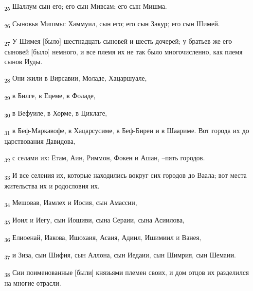 \begin{tcolorbox}
\textsubscript{25} Шаллум сын его; его сын Мивсам; его сын Мишма.
\end{tcolorbox}
\begin{tcolorbox}
\textsubscript{26} Сыновья Мишмы: Хаммуил, сын его; его сын Закур; его сын Шимей.
\end{tcolorbox}
\begin{tcolorbox}
\textsubscript{27} У Шимея [было] шестнадцать сыновей и шесть дочерей; у братьев же его сыновей [было] немного, и все племя их не так было многочисленно, как племя сынов Иуды.
\end{tcolorbox}
\begin{tcolorbox}
\textsubscript{28} Они жили в Вирсавии, Моладе, Хацаршуале,
\end{tcolorbox}
\begin{tcolorbox}
\textsubscript{29} в Билге, в Ецеме, в Фоладе,
\end{tcolorbox}
\begin{tcolorbox}
\textsubscript{30} в Вефуиле, в Хорме, в Циклаге,
\end{tcolorbox}
\begin{tcolorbox}
\textsubscript{31} в Беф-Маркавофе, в Хацарсусиме, в Беф-Биреи и в Шаариме. Вот города их до царствования Давидова,
\end{tcolorbox}
\begin{tcolorbox}
\textsubscript{32} с селами их: Етам, Аин, Риммон, Фокен и Ашан, --пять городов.
\end{tcolorbox}
\begin{tcolorbox}
\textsubscript{33} И все селения их, которые находились вокруг сих городов до Ваала; вот места жительства их и родословия их.
\end{tcolorbox}
\begin{tcolorbox}
\textsubscript{34} Мешовав, Иамлех и Иосия, сын Амассии,
\end{tcolorbox}
\begin{tcolorbox}
\textsubscript{35} Иоил и Иегу, сын Иошиви, сына Сераии, сына Асиилова,
\end{tcolorbox}
\begin{tcolorbox}
\textsubscript{36} Елиоенай, Иакова, Ишохаия, Асаия, Адиил, Ишимиил и Ванея,
\end{tcolorbox}
\begin{tcolorbox}
\textsubscript{37} и Зиза, сын Шифия, сын Аллона, сын Иедаии, сын Шимрия, сын Шемаии.
\end{tcolorbox}
\begin{tcolorbox}
\textsubscript{38} Сии поименованные [были] князьями племен своих, и дом отцов их разделился на многие отрасли.
\end{tcolorbox}
